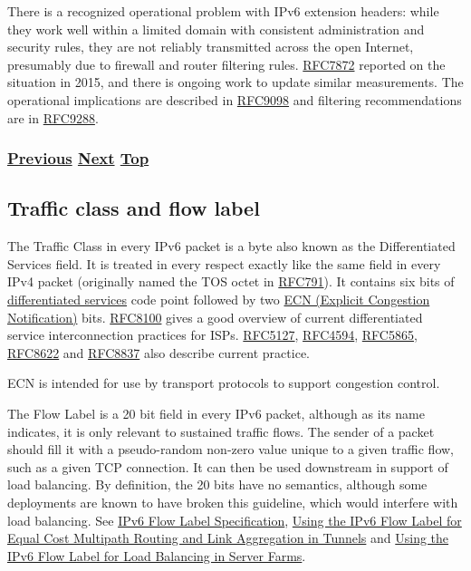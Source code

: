 \documentclass[
]{article}
\begin{document}
There is a recognized operational problem with IPv6 extension headers:
while they work well within a limited domain with consistent
administration and security rules, they are not reliably transmitted
across the open Internet, presumably due to firewall and router
filtering rules. \href{https://www.rfc-editor.org/info/rfc7872}{RFC7872}
reported on the situation in 2015, and there is ongoing work to update
similar measurements. The operational implications are described in
\href{https://www.rfc-editor.org/info/rfc9098}{RFC9098} and filtering
recommendations are in
\href{https://www.rfc-editor.org/info/rfc9288}{RFC9288}.

\subsubsection{\texorpdfstring{\hyperref[transport-protocols]{Previous}
\hyperref[traffic-class-and-flow-label]{Next}
\hyperref[ipv6-basic-technology]{Top}}{Previous Next Top}}\label{previous-next-top-15}

\pagebreak

\subsection{Traffic class and flow
label}\label{traffic-class-and-flow-label}

The Traffic Class in every IPv6 packet is a byte also known as the
Differentiated Services field. It is treated in every respect exactly
like the same field in every IPv4 packet (originally named the TOS octet
in \href{https://www.rfc-editor.org/info/rfc791}{RFC791}). It contains
six bits of
\href{https://www.rfc-editor.org/info/rfc2474}{differentiated services}
code point followed by two
\href{https://www.rfc-editor.org/info/rfc3168}{ECN (Explicit Congestion
Notification)} bits.
\href{https://www.rfc-editor.org/info/rfc8100}{RFC8100} gives a good
overview of current differentiated service interconnection practices for
ISPs. \href{https://www.rfc-editor.org/info/rfc5127}{RFC5127},
\href{https://www.rfc-editor.org/info/rfc4594}{RFC4594},
\href{https://www.rfc-editor.org/info/rfc5865}{RFC5865},
\href{https://www.rfc-editor.org/info/rfc8622}{RFC8622} and
\href{https://www.rfc-editor.org/info/rfc8837}{RFC8837} also describe
current practice.

ECN is intended for use by transport protocols to support congestion
control.

The Flow Label is a 20 bit field in every IPv6 packet, although as its
name indicates, it is only relevant to sustained traffic flows. The
sender of a packet should fill it with a pseudo-random non-zero value
unique to a given traffic flow, such as a given TCP connection. It can
then be used downstream in support of load balancing. By definition, the
20 bits have no semantics, although some deployments are known to have
broken this guideline, which would interfere with load balancing. See
\href{https://www.rfc-editor.org/info/rfc6437}{IPv6 Flow Label
Specification}, \href{https://www.rfc-editor.org/info/rfc6438}{Using the
IPv6 Flow Label for Equal Cost Multipath Routing and Link Aggregation in
Tunnels} and \href{https://www.rfc-editor.org/info/rfc7098}{Using the
IPv6 Flow Label for Load Balancing in Server Farms}.
\end{document}
